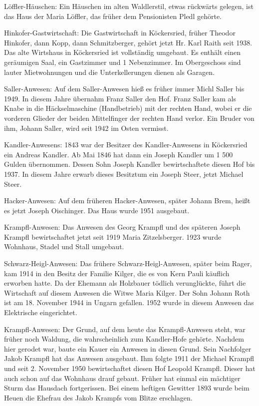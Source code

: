 \documentclass[12pt,a4pager]{book}
\begin{document}
Löffler-Häuschen: Ein Häuschen im alten Waldlerstil, etwas rückwärts gelegen,
ist das Haus der Maria Löffler, das früher dem Pensionisten Pledl gehörte.

Hinkofer-Gastwirtschaft: Die Gastwirtschaft in Köckersried, früher Theodor
Hinkofer, dann Kopp, dann Schmitzberger, gehört jetzt Hr. Karl Raith seit 1938.
Das alte Wirtshaus in Köckersried ist vollständig umgebaut. Es enthält einen
geräumigen Saal, ein Gastzimmer und 1 Nebenzimmer. Im Obergeschoss sind lauter
Mietwohnungen und die Unterkellerungen dienen als Garagen.

Saller-Anwesen: Auf dem Saller-Anwesen hieß es früher immer Michl Saller bis
1949. In diesem Jahre übernahm Franz Saller den Hof. Franz Saller kam als Knabe
in die Häckselmaschine (Handbetrieb) mit der rechten Hand, wobei er die vorderen
Glieder der beiden Mittelfinger der rechten Hand verlor. Ein Bruder von ihm,
Johann Saller, wird seit 1942 im Osten vermisst.

Kandler-Anwesens: 1843 war der Besitzer des Kandler-Anwesens in Köckersried ein
Andreas Kandler. Ab Mai 1846 hat dann ein Joseph Kandler um 1 500 Gulden
übernommen. Dessen Sohn Joseph Kandler bewirtschaftete diesen Hof bis 1937. In
diesem Jahre erwarb dieses Besitztum ein Joseph Steer, jetzt Michael Steer.

Hacker-Anwesen: Auf dem früheren Hacker-Anwesen, später Johann Brem, heißt es
jetzt Joseph Oischinger. Das Haus wurde 1951 ausgebaut.

Krampfl-Anwesen: Das Anwesen des Georg Krampfl und des späteren Joseph Krampfl
bewirtschaftet jetzt seit 1919 Maria Zitzelsberger. 1923 wurde Wohnhaus, Stadel
und Stall umgebaut.

Schwarz-Heigl-Anwesen: Das frühere Schwarz-Heigl-Anwesen, später beim Rager, kam
1914 in den Besitz der Familie Kilger, die es von Kern Pauli käuflich erworben
hatte. Da der Ehemann als Holzbauer tödlich verunglückte, führt die Wirtschaft
auf diesem Anwesen die Witwe Maria Kilger. Der Sohn Johann Roth ist am 18.
November 1944 in Ungarn gefallen. 1952 wurde in diesem Anwesen das Elektrische
eingerichtet.

Krampfl-Anwesen: Der Grund, auf dem heute das Krampfl-Anwesen steht, war früher
noch Waldung, die wahrscheinlich zum Kandler-Hofe gehörte. Nachdem hier gerodet
war, baute ein Kauer ein Anwesen in diesen Grund. Sein Nachfolger Jakob Krampfl
hat das Anwesen ausgebaut. Ihm folgte 1911 der Michael Krampfl und seit 2.
November 1950 bewirtschaftet diesen Hof Leopold Krampfl. Dieser hat auch schon
auf das Wohnhaus drauf gebaut. Früher hat einmal ein mächtiger Sturm das
Hausdach fortgerissen. Bei einem heftigen Gewitter 1893 wurde beim Heuen die
Ehefrau des Jakob Krampfs vom Blitze erschlagen.
\end{document}
